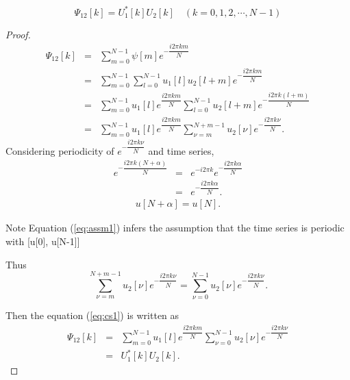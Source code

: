 \documentclass{proposal}
\begin{document}
\begin{lemma}
\begin{equation}
\Psi_{12}[k] = U_1^*[k]U_2[k] \quad (k =0, 1, 2, \cdots, N-1)
\end{equation}
\end{lemma}

\begin{proof}
\begin{eqnarray}
\Psi_{12}[k] &=& \sum_{m=0}^{N-1}\psi[m]e^{-\dfrac{i2\pi km}{N}}   \\
&=& \sum_{m=0}^{N-1} \sum_{l=0}^{N-1}u_1[l]u_2[l+m] e^{-\dfrac{i2\pi km}{N}}\\
&=& \sum_{m=0}^{N-1} u_1[l] e^{\dfrac{i2\pi km}{N}} \sum_{l=0}^{N-1}u_2[l+m] e^{-\dfrac{i2\pi k(l+m)}{N}}\\
\label{eq:cs1}
&=& \sum_{m=0}^{N-1} u_1[l] e^{\dfrac{i2\pi km}{N}} \sum_{\nu=m}^{N+m-1}u_2[\nu] e^{-\dfrac{i2\pi k\nu}{N}}.
\end{eqnarray}
Considering periodicity of $e^{-\dfrac{i2\pi k\nu}{N}}$ and time series,
\begin{eqnarray}
e^{-\dfrac{i2\pi k(N+\alpha)}{N}} &=& e^{-i2\pi k} e ^{-\dfrac{i2\pi k\alpha}{N}}\\
&=& e ^{-\dfrac{i2\pi k\alpha}{N}}.
\end{eqnarray}
\begin{eqnarray}
u[N+\alpha] = u[N].
\label{eq:assm1}
\end{eqnarray}

\begin{itembox}[l]{Note}
Equation (\ref{eq:assm1}) infers the assumption that the time series is periodic with [u[0], u[N-1]]
\end{itembox}

Thus
\begin{equation}
\sum_{\nu=m}^{N+m-1}u_2[\nu] e^{-\dfrac{i2\pi k\nu}{N}} = \sum_{\nu=0}^{N-1}u_2[\nu] e^{-\dfrac{i2\pi k\nu}{N}}.
\end{equation}


Then the equation (\ref{eq:cs1}) is written as
\begin{eqnarray}
\Psi_{12}[k] &=& \sum_{m=0}^{N-1} u_1[l] e^{\dfrac{i2\pi km}{N}} \sum_{\nu=0}^{N-1}u_2[\nu] e^{-\dfrac{i2\pi k\nu}{N}}\\
&=&  U_1^*[k]U_2[k].
\end{eqnarray}

\end{proof}
  

%
\end{document}
